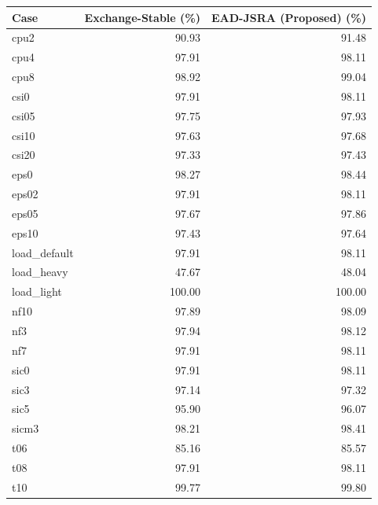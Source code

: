 \begin{tabular}{lrr}
\toprule
Case & Exchange-Stable (\%) & EAD-JSRA (Proposed) (\%) \\
\midrule
cpu2 & 90.93 & 91.48 \\
cpu4 & 97.91 & 98.11 \\
cpu8 & 98.92 & 99.04 \\
csi0 & 97.91 & 98.11 \\
csi05 & 97.75 & 97.93 \\
csi10 & 97.63 & 97.68 \\
csi20 & 97.33 & 97.43 \\
eps0 & 98.27 & 98.44 \\
eps02 & 97.91 & 98.11 \\
eps05 & 97.67 & 97.86 \\
eps10 & 97.43 & 97.64 \\
load\_default & 97.91 & 98.11 \\
load\_heavy & 47.67 & 48.04 \\
load\_light & 100.00 & 100.00 \\
nf10 & 97.89 & 98.09 \\
nf3 & 97.94 & 98.12 \\
nf7 & 97.91 & 98.11 \\
sic0 & 97.91 & 98.11 \\
sic3 & 97.14 & 97.32 \\
sic5 & 95.90 & 96.07 \\
sicm3 & 98.21 & 98.41 \\
t06 & 85.16 & 85.57 \\
t08 & 97.91 & 98.11 \\
t10 & 99.77 & 99.80 \\
\bottomrule
\end{tabular}
